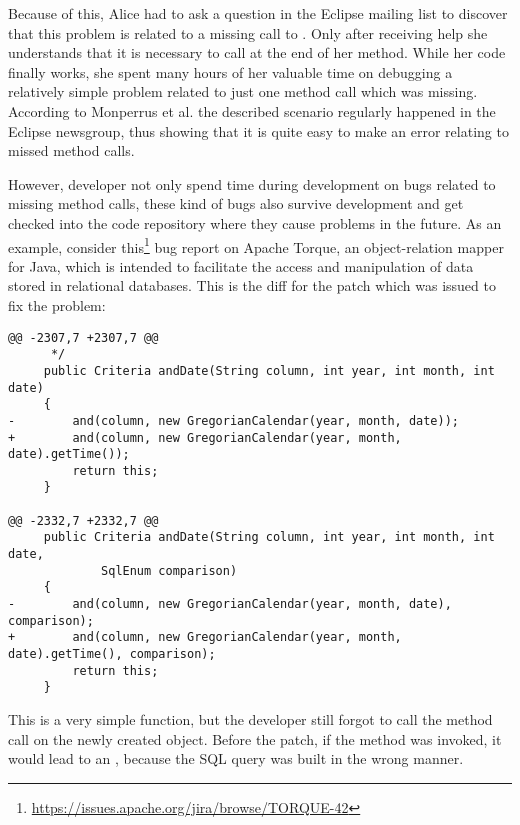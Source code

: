 Because of this, Alice had to ask a question in the Eclipse mailing list to discover that this problem is related to a missing call to .
Only after receiving help she understands that it is necessary to call  at the end of her  method.
While her code finally works, she spent many hours of her valuable time on debugging a relatively simple problem related to just one method call which was missing.
According to Monperrus et al. the described scenario regularly happened in the Eclipse newsgroup, thus showing that it is quite easy to make an error relating to missed method calls.

However, developer not only spend time during development on bugs related to missing method calls, these kind of bugs also survive development and get checked into the code repository where they cause problems in the future.
As an example, consider this\footnote{\url{https://issues.apache.org/jira/browse/TORQUE-42}} bug report on Apache Torque, an object-relation mapper for Java, which is intended to facilitate the access and manipulation of data stored in relational databases.
This is the diff for the patch which was issued to fix the problem:
\begin{lstlisting}    
@@ -2307,7 +2307,7 @@
      */
     public Criteria andDate(String column, int year, int month, int date)
     {
-        and(column, new GregorianCalendar(year, month, date));
+        and(column, new GregorianCalendar(year, month, date).getTime());
         return this;
     }
 
@@ -2332,7 +2332,7 @@
     public Criteria andDate(String column, int year, int month, int date,
             SqlEnum comparison)
     {
-        and(column, new GregorianCalendar(year, month, date), comparison);
+        and(column, new GregorianCalendar(year, month, date).getTime(), comparison);
         return this;
     }
\end{lstlisting}
This is a very simple function, but the developer still forgot to call the  method call on the newly created  object.
Before the patch, if the  method was invoked, it would lead to an , because the SQL query was built in the wrong manner.

